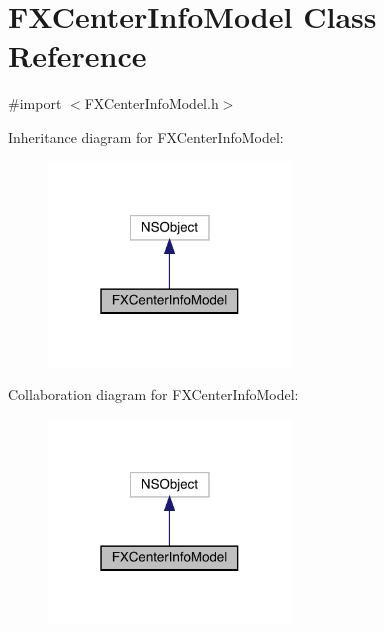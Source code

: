 \hypertarget{interface_f_x_center_info_model}{}\section{F\+X\+Center\+Info\+Model Class Reference}
\label{interface_f_x_center_info_model}


{\ttfamily \#import $<$F\+X\+Center\+Info\+Model.\+h$>$}



Inheritance diagram for F\+X\+Center\+Info\+Model\+:\nopagebreak
\begin{figure}[H]
\begin{center}
\leavevmode
\includegraphics[width=183pt]{interface_f_x_center_info_model__inherit__graph}
\end{center}
\end{figure}


Collaboration diagram for F\+X\+Center\+Info\+Model\+:\nopagebreak
\begin{figure}[H]
\begin{center}
\leavevmode
\includegraphics[width=183pt]{interface_f_x_center_info_model__coll__graph}
\end{center}
\end{figure}
